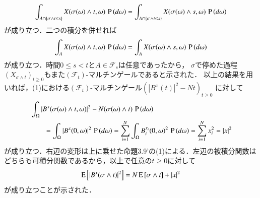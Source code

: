 \begin{prf}
\begin{description}
		\begin{align}
			\int_{A \cap \{ \sigma \wedge t \leq s \}} X(\sigma(\omega) \wedge t, \omega)\, \operatorname{P} \left(d\omega\right)
			= \int_{A \cap \{ \sigma \wedge t \leq s \}} X(\sigma(\omega) \wedge s, \omega)\, \operatorname{P} \left(d\omega\right)
		\end{align}
		が成り立つ．二つの積分を併せれば
		\begin{align}
			\int_{A} X(\sigma(\omega) \wedge t, \omega)\, \operatorname{P} \left(d\omega\right)
			= \int_{A} X(\sigma(\omega) \wedge s, \omega)\, \operatorname{P} \left(d\omega\right)
		\end{align}
		が成り立つ．時間$0 \leq s < t$と$A \in \mathcal{F}_s$は任意であったから，
		$\sigma$で停めた過程$(X_{\sigma \wedge t})_{t \geq 0}$もまた$(\mathcal{F}_t)$-マルチンゲールであると示された．
		以上の結果を用いれば，(1)における$(\mathcal{F}_t)$-マルチンゲール$\left(|B^x(t)|^2 - Nt\right)_{t \geq 0}$
		に対して
		\begin{align}
			&\int_{\Omega} |B^x(\sigma(\omega) \wedge t,\omega)|^2 - N(\sigma(\omega) \wedge t)\, \operatorname{P} \left(d\omega\right) \\
			&\qquad= \int_{\Omega} |B^x(0,\omega)|^2\, \operatorname{P} \left(d\omega\right)
			= \sum_{i=1}^{N} \int_{\Omega} B_i^{x_i}(0,\omega)^2\, \operatorname{P} \left(d\omega\right)
			= \sum_{i=1}^{N} x_i^2
			= |x|^2
		\end{align}
		が成り立つ．右辺の変形は上に乗せた命題3.9'の(1)による．左辺の被積分関数はどちらも可積分関数であるから，以上で任意の$t \geq 0$に対して
		\begin{align}
			\operatorname{E} \left[ |B^x(\sigma \wedge t)|^2 \right] = N\operatorname{E} \left[ \sigma \wedge t \right] + |x|^2
		\end{align}
		が成り立つことが示された．
		

\end{description}
\end{prf}
